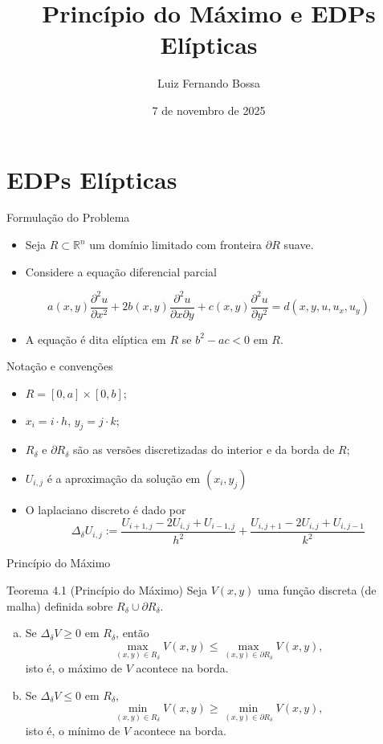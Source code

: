 \documentclass{beamer}
\title{Princípio do Máximo e EDPs Elípticas}
\author{Luiz Fernando Bossa}
\date{7 de novembro de 2025}
\institute{Universidade Federal de Santa Catarina}
\newcommand{\RR}{\mathbb{R}}
\newcommand{\dR}{\partial R}
\begin{document}
\frame{\titlepage}

\section{EDPs Elípticas}

\begin{frame}{Formulação do Problema}
\begin{itemize}
    \item  Seja $R \subset \RR^n$ um domínio limitado com fronteira $\dR$ suave. 
    \item  Considere a equação diferencial parcial
    \end{itemize} \medskip
    {\small\begin{equation*}\tag{4.1}
        a(x,y)\frac{\partial^2 u}{\partial x^2} + 2b(x,y)\frac{\partial^2 u}{\partial x \partial y} + c(x,y)\frac{\partial^2 u}{\partial y^2}  = d(x,y,u,u_x,u_y)
    \end{equation*}}
    \begin{itemize}
     \item     A equação é dita elíptica em $R$ se $b^2 - ac < 0$ em $R$.
\end{itemize}
\end{frame}

\begin{frame}{Notação e convenções}

\begin{itemize}[<+->]
    \item $R = [0,a]\times[0,b]$;
    \item $x_i = i\cdot h$, $y_j = j\cdot k$;
    \item $R_\delta$ e $\dR_\delta$ são as versões discretizadas do interior e da borda de $R$;
    \item $U_{i,j}$ é a aproximação da solução em $(x_i,y_j)$  
    \item O laplaciano discreto é dado por
    \[\Delta_\delta U_{i,j} := \frac{U_{i+1,j}-2U_{i,j} + U_{i-1,j}}{h^2} +  \frac{U_{i,j+1}-2U_{i,j} + U_{i,j-1}}{k^2}  \]
\end{itemize}
\end{frame}

\begin{frame}{Princípio do Máximo}

\begin{block}{Teorema 4.1 (Princípio do Máximo)}
    Seja $V(x,y)$ uma função discreta (de malha) definida sobre $R_\delta\cup\dR_\delta$.
    \begin{enumerate}[(a)]
        \item Se $\Delta_\delta V \ge 0$ em $R_\delta$, então 
        \[\max_{(x,y)\in R_\delta} V(x,y) \le \max_{(x,y)\in \dR_\delta} V(x,y),\]
        isto é, o máximo de $V$ acontece na borda.
        \item Se $\Delta_\delta V \le 0$ em $R_\delta$,
        \[\min_{(x,y)\in R_\delta} V(x,y) \ge \min_{(x,y)\in \dR_\delta} V(x,y),\]
        isto é, o mínimo de $V$ acontece na borda.
    \end{enumerate}
\end{block}
    
\end{frame}
\end{document}
